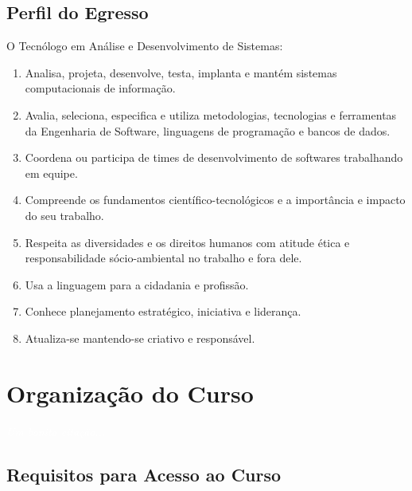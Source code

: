 \documentclass[11pt,fleqn]{book} %
\begin{document}
\section{Perfil do Egresso}
O Tecnólogo em Análise e Desenvolvimento de Sistemas:
\begin{enumerate}
	\item Analisa, projeta, desenvolve, testa, implanta e mantém sistemas computacionais de informação. 
	\item Avalia, seleciona, especifica e utiliza metodologias, tecnologias e ferramentas da Engenharia de Software, linguagens de programação e bancos de dados. 
	\item Coordena ou participa de times de desenvolvimento de softwares trabalhando em equipe.
	\item Compreende os fundamentos científico-tecnológicos e a importância e impacto do seu trabalho.
	\item Respeita as diversidades e os direitos humanos com atitude ética e responsabilidade sócio-ambiental no trabalho e fora dele.
	\item Usa a linguagem para a cidadania e profissão.
	\item Conhece planejamento estratégico, iniciativa e liderança.
	\item Atualiza-se mantendo-se criativo e responsável.
\end{enumerate}

\chapter{Organização do Curso}\label{organizacao}
\vspace{6em}
\begin{flushright}
	\textit{\textcolor{white}{Um bonita citação...}}
\end{flushright}
\vspace{12em}

\section{Requisitos para Acesso ao Curso}

\end{document}
